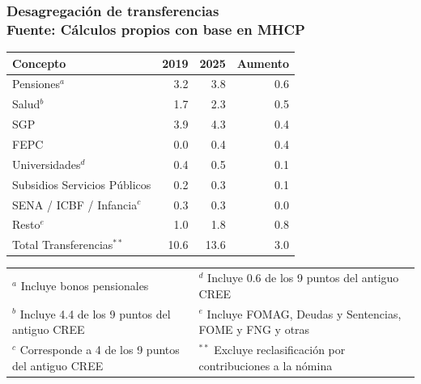 \begin{frame}

\frametitle{Desagregación de transferencias \\ \small{Fuente: Cálculos propios con base en MHCP}}
\begin{center}
\begin{table}
\centering
\renewcommand{\arraystretch}{1.15}
\begin{tabular}{l r r r}
\hline
\textbf{Concepto} & \textbf{2019} & \textbf{2025} & \textbf{Aumento} \\
\hline
Pensiones$^{a}$ & 3.2 & 3.8 & 0.6 \\
Salud$^{b}$ & 1.7 & 2.3 & 0.5 \\
SGP & 3.9 & 4.3 & 0.4 \\
FEPC & 0.0 & 0.4 & 0.4 \\
Universidades$^{d}$ & 0.4 & 0.5 & 0.1 \\
Subsidios Servicios P\'ublicos & 0.2 & 0.3 & 0.1 \\
SENA / ICBF / Infancia$^{c}$ & 0.3 & 0.3 & 0.0 \\
Resto$^{e}$ & 1.0 & 1.8 & 0.8 \\
\hline
Total Transferencias$^{**}$ & 10.6 & 13.6 & 3.0 \\
\hline
\end{tabular}
\end{table}

\vspace{0.25cm}
{\footnotesize
\begin{tabular}{p{} p{}}
$^{a}$ \tiny Incluye bonos pensionales &
$^{d}$ \tiny Incluye 0.6 de los 9 puntos del antiguo CREE \\
$^{b}$ \tiny Incluye 4.4 de los 9 puntos del antiguo CREE &
$^{e}$ \tiny Incluye FOMAG, Deudas y Sentencias, FOME y FNG y otras\\
$^{c}$ \tiny Corresponde a 4 de los 9 puntos del antiguo CREE &
$^{**}$ \tiny Excluye reclasificaci\'on por contribuciones a la n\'omina \\
\end{tabular}
}
\end{center}
\end{frame}